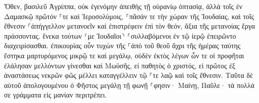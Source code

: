 \documentclass{openreader}
\begin{document}
Ὅθεν, βασιλεῦ Ἀγρίππα, οὐκ ἐγενόμην ἀπειθὴς τῇ οὐρανίῳ ὀπτασίᾳ, 
ἀλλὰ τοῖς ἐν Δαμασκῷ πρῶτόν ⸀τε καὶ Ἱεροσολύμοις, ⸀πᾶσάν τε τὴν χώραν τῆς Ἰουδαίας, καὶ τοῖς ἔθνεσιν ⸀ἀπήγγελλον μετανοεῖν καὶ ἐπιστρέφειν ἐπὶ τὸν θεόν, ἄξια τῆς μετανοίας ἔργα πράσσοντας. 
ἕνεκα τούτων ⸂με Ἰουδαῖοι⸃ ⸀συλλαβόμενοι ἐν τῷ ἱερῷ ἐπειρῶντο διαχειρίσασθαι. 
ἐπικουρίας οὖν τυχὼν τῆς ⸀ἀπὸ τοῦ θεοῦ ἄχρι τῆς ἡμέρας ταύτης ἕστηκα μαρτυρόμενος μικρῷ τε καὶ μεγάλῳ, οὐδὲν ἐκτὸς λέγων ὧν τε οἱ προφῆται ἐλάλησαν μελλόντων γίνεσθαι καὶ Μωϋσῆς, 
εἰ παθητὸς ὁ χριστός, εἰ πρῶτος ἐξ ἀναστάσεως νεκρῶν φῶς μέλλει καταγγέλλειν τῷ ⸀τε λαῷ καὶ τοῖς ἔθνεσιν. 
Ταῦτα δὲ αὐτοῦ ἀπολογουμένου ὁ Φῆστος μεγάλῃ τῇ φωνῇ ⸀φησιν· Μαίνῃ, Παῦλε· τὰ πολλά σε γράμματα εἰς μανίαν περιτρέπει. 
\end{document}

